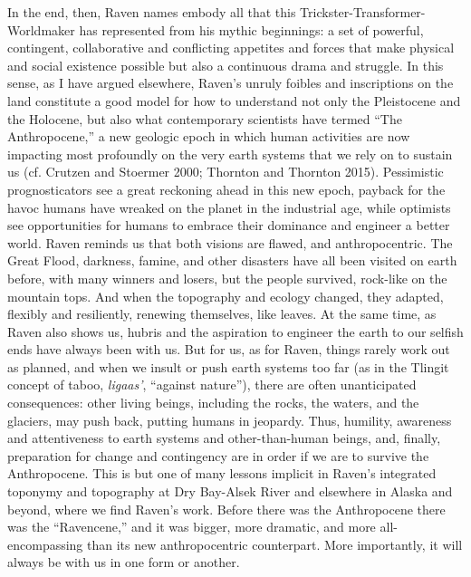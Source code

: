 In the end, then, Raven names embody all that this Trickster-Transformer-Worldmaker has represented from his mythic beginnings: a set of powerful, contingent, collaborative and conflicting appetites and forces that make physical and social existence possible but also a continuous drama and struggle. In this sense, as I have argued elsewhere, Raven’s unruly foibles and inscriptions on the land constitute a good model for how to understand not only the Pleistocene and the Holocene, but also what contemporary scientists have termed “The Anthropocene,” a new geologic epoch in which human activities are now impacting most profoundly on the very earth systems that we rely on to sustain us (cf. Crutzen and Stoermer 2000; Thornton and Thornton 2015).  Pessimistic prognosticators see a great reckoning ahead in this new epoch, payback for the havoc humans have wreaked on the planet in the industrial age, while optimists see opportunities for humans to embrace their dominance and engineer a better world.  Raven reminds us that both visions are flawed, and anthropocentric.  The Great Flood, darkness, famine, and other disasters have all been visited on earth before, with many winners and losers, but the people survived, rock-like on the mountain tops. And when the topography and ecology changed, they adapted, flexibly and resiliently, renewing themselves, like leaves.  At the same time, as Raven also shows us, hubris and the aspiration to engineer the earth to our selfish ends have always been with us. But for us, as for Raven, things rarely work out as planned, and when we insult or push earth systems too far (as in the Tlingit concept of taboo, \textit{ligaas’}, “against nature”), there are often unanticipated consequences: other living beings, including the rocks, the waters, and the glaciers, may push back, putting humans in jeopardy.  Thus, humility, awareness and attentiveness to earth systems and other-than-human beings, and, finally, preparation for change and contingency are in order if we are to survive the Anthropocene.  This is but one of many lessons implicit in Raven’s integrated toponymy and topography at Dry Bay-Alsek River and elsewhere in Alaska and beyond, where we find Raven’s work. Before there was the Anthropocene there was the “Ravencene,” and it was bigger, more dramatic, and more all-encompassing than its new anthropocentric counterpart. More importantly, it will always be with us in one form or another.



